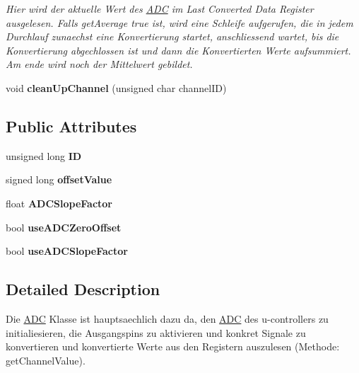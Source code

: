 \begin{DoxyCompactItemize}
\begin{DoxyCompactList}\small\item\em Hier wird der aktuelle Wert des \hyperlink{class_a_d_c}{A\+D\+C} im Last Converted Data Register ausgelesen. Falls get\+Average true ist, wird eine Schleife aufgerufen, die in jedem Durchlauf zunaechst eine Konvertierung startet, anschliessend wartet, bis die Konvertierung abgechlossen ist und dann die Konvertierten Werte aufsummiert. Am ende wird noch der Mittelwert gebildet. \end{DoxyCompactList}\item 
\hypertarget{class_a_d_c_a6d175ebd102264c2043ac249fc995a38}{}void {\bfseries clean\+Up\+Channel} (unsigned char channel\+I\+D)\label{class_a_d_c_a6d175ebd102264c2043ac249fc995a38}

\end{DoxyCompactItemize}
\subsection*{Public Attributes}
\begin{DoxyCompactItemize}
\item 
\hypertarget{class_a_d_c_a9b93aca8c177e0a1e7e1e69aff2a3480}{}unsigned long {\bfseries I\+D}\label{class_a_d_c_a9b93aca8c177e0a1e7e1e69aff2a3480}

\item 
\hypertarget{class_a_d_c_ad047f7b18a0dfb921d22c561e853295d}{}signed long {\bfseries offset\+Value}\label{class_a_d_c_ad047f7b18a0dfb921d22c561e853295d}

\item 
\hypertarget{class_a_d_c_af7b03605fc3c150f04f2052fc0d86ee3}{}float {\bfseries A\+D\+C\+Slope\+Factor}\label{class_a_d_c_af7b03605fc3c150f04f2052fc0d86ee3}

\item 
\hypertarget{class_a_d_c_a543f8e1c77ab4ac4247d54d81e25398d}{}bool {\bfseries use\+A\+D\+C\+Zero\+Offset}\label{class_a_d_c_a543f8e1c77ab4ac4247d54d81e25398d}

\item 
\hypertarget{class_a_d_c_ab96ede2a6272396d5a5e0c7a7e78717d}{}bool {\bfseries use\+A\+D\+C\+Slope\+Factor}\label{class_a_d_c_ab96ede2a6272396d5a5e0c7a7e78717d}

\end{DoxyCompactItemize}


\subsection{Detailed Description}
Die \hyperlink{class_a_d_c}{A\+D\+C} Klasse ist hauptsaechlich dazu da, den \hyperlink{class_a_d_c}{A\+D\+C} des u-\/controllers zu initialiesieren, die Ausgangspins zu aktivieren und konkret Signale zu konvertieren und konvertierte Werte aus den Registern auszulesen (Methode\+: get\+Channel\+Value).

